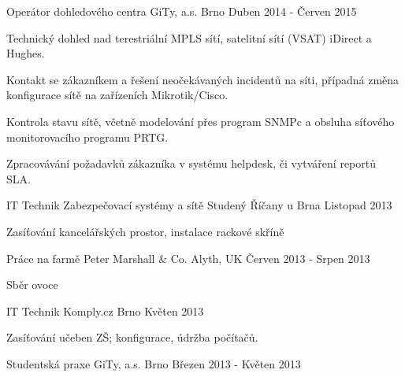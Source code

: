 

\begin{cventries}

  \cventry
    {Operátor dohledového centra} %
    {GiTy, a.s.} %
    {Brno} %
    {Duben 2014 - Červen 2015} %
    {
      \begin{cvitems} %
        \item {Technický dohled nad terestriální MPLS sítí, satelitní sítí (VSAT) iDirect a Hughes.}
        \item {Kontakt se zákazníkem a řešení neočekávaných incidentů na síti, případná změna konfigurace sítě na zařízeních Mikrotik/Cisco.}
        \item {Kontrola stavu sítě, včetně modelování přes program SNMPc a obsluha síťového monitorovacího programu PRTG.}
        \item {Zpracovávání požadavků zákazníka v systému helpdesk, či vytváření reportů SLA. }
      \end{cvitems}
    }
   \cventry
   {IT Technik}
   {Zabezpečovací systémy a sítě Studený}
   {Říčany u Brna}
   {Listopad 2013}
   {
    \begin{cvitems}
      \item {Zasíťování kancelářských prostor, instalace rackové skříně}
    \end{cvitems}
   }
   \cventry
   {Práce na farmě}
   {Peter Marshall \& Co.}
   {Alyth, UK}
   {Červen 2013 - Srpen 2013}
   {
    \begin{cvitems}
      \item {Sběr ovoce}
    \end{cvitems}
   }
   \cventry
   {IT Technik}
   {Komply.cz}
   {Brno}
   {Květen 2013}
   {
    \begin{cvitems}
      \item {Zasíťování učeben ZŠ; konfigurace, údržba počítačů.}
    \end{cvitems}
   }
   \cventry
   {Studentská praxe}
   {GiTy, a.s.}
   {Brno}
   {Březen 2013 - Květen 2013}
   {
    \begin{cvitems}

\end{cvitems}}
\end{cventries}
